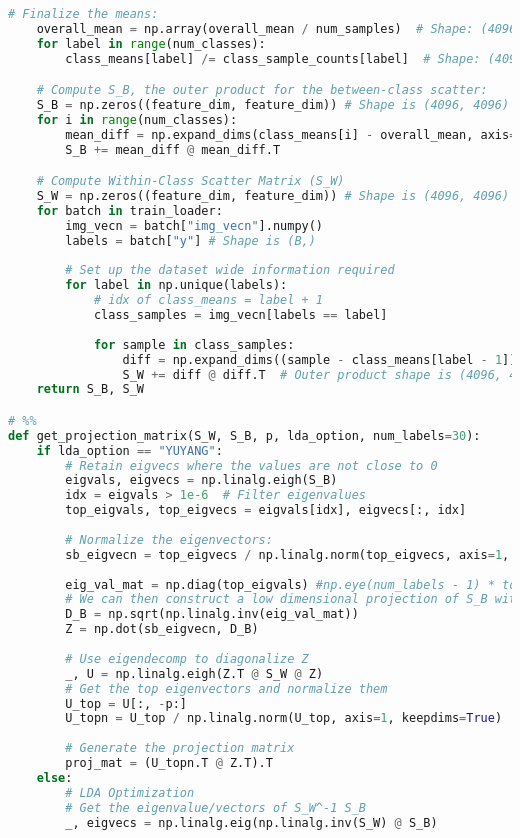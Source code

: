 \documentclass{article}
\begin{document}
\begin{lstlisting}[language=Python]
    # Finalize the means:
    overall_mean = np.array(overall_mean / num_samples)  # Shape: (4096,)
    for label in range(num_classes):
        class_means[label] /= class_sample_counts[label]  # Shape: (4096,)

    # Compute S_B, the outer product for the between-class scatter:
    S_B = np.zeros((feature_dim, feature_dim)) # Shape is (4096, 4096)
    for i in range(num_classes):
        mean_diff = np.expand_dims(class_means[i] - overall_mean, axis=1) # Shape is (4096, 1)
        S_B += mean_diff @ mean_diff.T

    # Compute Within-Class Scatter Matrix (S_W)
    S_W = np.zeros((feature_dim, feature_dim)) # Shape is (4096, 4096)
    for batch in train_loader:
        img_vecn = batch["img_vecn"].numpy()
        labels = batch["y"] # Shape is (B,)
        
        # Set up the dataset wide information required
        for label in np.unique(labels):
            # idx of class_means = label + 1
            class_samples = img_vecn[labels == label]
            
            for sample in class_samples:
                diff = np.expand_dims((sample - class_means[label - 1]), axis=1)  # Shape: (4096, 1)
                S_W += diff @ diff.T  # Outer product shape is (4096, 4096)
    return S_B, S_W

# %%
def get_projection_matrix(S_W, S_B, p, lda_option, num_labels=30):
    if lda_option == "YUYANG":
        # Retain eigvecs where the values are not close to 0
        eigvals, eigvecs = np.linalg.eigh(S_B)
        idx = eigvals > 1e-6  # Filter eigenvalues
        top_eigvals, top_eigvecs = eigvals[idx], eigvecs[:, idx]
        
        # Normalize the eigenvectors:
        sb_eigvecn = top_eigvecs / np.linalg.norm(top_eigvecs, axis=1, keepdims=True) # Shapes is (CHW, K_Y)
        
        eig_val_mat = np.diag(top_eigvals) #np.eye(num_labels - 1) * top_eigvals
        # We can then construct a low dimensional projection of S_B with sb_eigvecn
        D_B = np.sqrt(np.linalg.inv(eig_val_mat))
        Z = np.dot(sb_eigvecn, D_B)
        
        # Use eigendecomp to diagonalize Z
        _, U = np.linalg.eigh(Z.T @ S_W @ Z)
        # Get the top eigenvectors and normalize them
        U_top = U[:, -p:]
        U_topn = U_top / np.linalg.norm(U_top, axis=1, keepdims=True)
        
        # Generate the projection matrix
        proj_mat = (U_topn.T @ Z.T).T
    else:
        # LDA Optimization
        # Get the eigenvalue/vectors of S_W^-1 S_B
        _, eigvecs = np.linalg.eig(np.linalg.inv(S_W) @ S_B)


\end{lstlisting}
\end{document}
